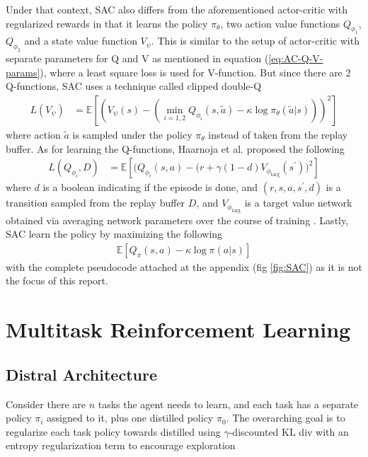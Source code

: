 \documentclass[12pt]{report}
\begin{document}
Under that context, SAC also differs from the aforementioned actor-critic with regularized rewards in that it learns the policy $\pi_\theta$, two action value functions $Q_{\phi_1}$, $Q_{\phi_2}$ and a state value function $V_\psi$. This is similar to the setup of actor-critic with separate parameters for Q and V as mentioned in equation (\ref{eq:AC-Q-V-params}), where a least square loss is used for V-function. But since there are 2 Q-functions, SAC uses a technique called clipped double-Q \cite{haarnoja2018soft1} \cite{spinningupRL}
\begin{align}
    L(V_\psi) &= \mathbb{E}\left[\left(V_\psi(s)-\left(\min_{i=1,2}Q_{\phi_i}(s,\tilde{a})-\kappa \log \pi_\theta(\tilde{a}|s)\right)\right)^2\right]
\end{align}
where action $\tilde{a}$ is sampled under the policy $\pi_\theta$ instead of taken from the replay buffer. As for learning the Q-functions, Haarnoja et al. \cite{haarnoja2018soft1} proposed the following
\begin{align}
    L(Q_{\phi_i},D) &= \mathbb{E}\left[\Big(Q_{\phi_i}(s,a)-(r+\gamma(1-d)V_{\phi_\text{targ}}(s^\prime)\Big)^2\right]
\end{align}
where $d$ is a boolean indicating if the episode is done, and $(r,s,a,s^\prime,d)$ is a transition sampled from the replay buffer $D$, and $V_{\phi_\text{targ}}$ is a target value network obtained via averaging network parameters over the course of training \cite{haarnoja2018soft}. Lastly, SAC learn the policy by maximizing the following
\begin{align}
    \mathbb{E}\left[Q_\pi(s,a)-\kappa \log\pi(a|s)\right]
\end{align}
with the complete pseudocode attached at the appendix (fig \ref{fig:SAC}) as it is not the focus of this report.

\section{Multitask Reinforcement Learning}

\subsection{Distral Architecture}
Consider there are $n$ tasks the agent needs to learn, and each task has a separate policy $\pi_i$ assigned to it, plus one distilled policy $\pi_0$. The overarching goal is to regularize each task policy towards distilled using $\gamma$-discounted KL div with an entropy regularization term to encourage exploration
\end{document}
